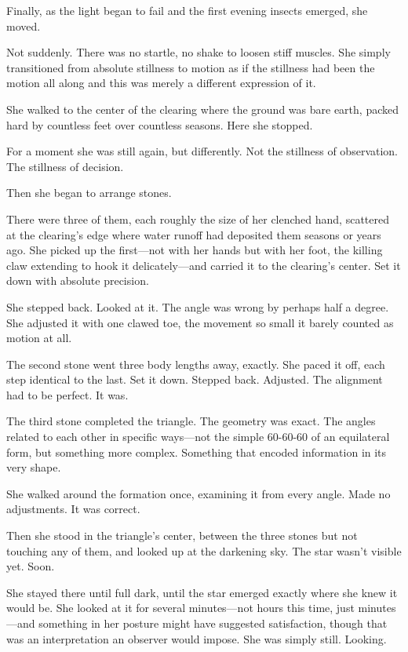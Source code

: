 Finally, as the light began to fail and the first evening insects emerged, she moved.

Not suddenly. There was no startle, no shake to loosen stiff muscles. She simply transitioned from absolute stillness to motion as if the stillness had been the motion all along and this was merely a different expression of it.

She walked to the center of the clearing where the ground was bare earth, packed hard by countless feet over countless seasons. Here she stopped.

For a moment she was still again, but differently. Not the stillness of observation. The stillness of decision.

Then she began to arrange stones.

There were three of them, each roughly the size of her clenched hand, scattered at the clearing's edge where water runoff had deposited them seasons or years ago. She picked up the first—not with her hands but with her foot, the killing claw extending to hook it delicately—and carried it to the clearing's center. Set it down with absolute precision.

She stepped back. Looked at it. The angle was wrong by perhaps half a degree. She adjusted it with one clawed toe, the movement so small it barely counted as motion at all.

The second stone went three body lengths away, exactly. She paced it off, each step identical to the last. Set it down. Stepped back. Adjusted. The alignment had to be perfect. It was.

The third stone completed the triangle. The geometry was exact. The angles related to each other in specific ways—not the simple 60-60-60 of an equilateral form, but something more complex. Something that encoded information in its very shape.

She walked around the formation once, examining it from every angle. Made no adjustments. It was correct.

Then she stood in the triangle's center, between the three stones but not touching any of them, and looked up at the darkening sky. The star wasn't visible yet. Soon.

She stayed there until full dark, until the star emerged exactly where she knew it would be. She looked at it for several minutes—not hours this time, just minutes—and something in her posture might have suggested satisfaction, though that was an interpretation an observer would impose. She was simply still. Looking.

